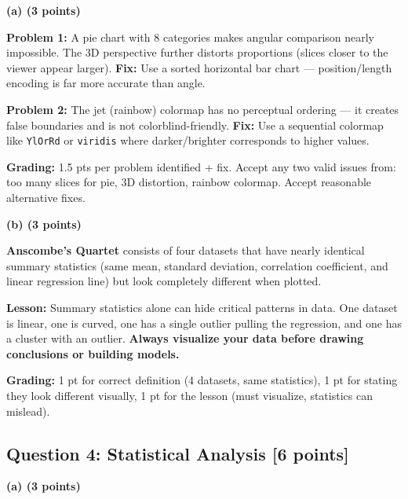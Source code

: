\documentclass[11pt,a4paper]{article}
\begin{document}
\noindent\textbf{(a) (3 points)}

\begin{answerbox}
\textbf{Problem 1:} A pie chart with 8 categories makes angular comparison nearly impossible. The 3D perspective further distorts proportions (slices closer to the viewer appear larger). \textbf{Fix:} Use a sorted horizontal bar chart --- position/length encoding is far more accurate than angle.

\textbf{Problem 2:} The jet (rainbow) colormap has no perceptual ordering --- it creates false boundaries and is not colorblind-friendly. \textbf{Fix:} Use a sequential colormap like \texttt{YlOrRd} or \texttt{viridis} where darker/brighter corresponds to higher values.

\textbf{Grading:} 1.5 pts per problem identified + fix. Accept any two valid issues from: too many slices for pie, 3D distortion, rainbow colormap. Accept reasonable alternative fixes.
\end{answerbox}

\vspace{0.3cm}

\noindent\textbf{(b) (3 points)}

\begin{answerbox}
\textbf{Anscombe's Quartet} consists of four datasets that have nearly identical summary statistics (same mean, standard deviation, correlation coefficient, and linear regression line) but look completely different when plotted.

\textbf{Lesson:} Summary statistics alone can hide critical patterns in data. One dataset is linear, one is curved, one has a single outlier pulling the regression, and one has a cluster with an outlier. \textbf{Always visualize your data before drawing conclusions or building models.}

\textbf{Grading:} 1 pt for correct definition (4 datasets, same statistics), 1 pt for stating they look different visually, 1 pt for the lesson (must visualize, statistics can mislead).
\end{answerbox}

\vspace{0.3cm}

\subsection*{Question 4: Statistical Analysis [6 points]}

\noindent\textbf{(a) (3 points)}
\end{document}
